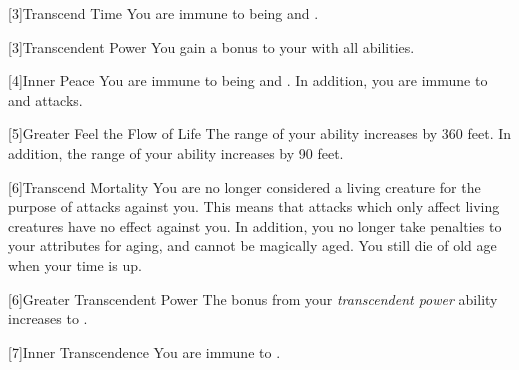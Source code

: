         [3]{Transcend Time} You are immune to being \slowed and \decelerated.

        [3]{Transcendent Power}
        You gain a  bonus to your  with all abilities.

        [4]{Inner Peace} You are immune to being \dazed and \stunned.
        In addition, you are immune to  and  attacks.

        [5]{Greater Feel the Flow of Life}
        The range of your  ability increases by 360 feet.
        In addition, the range of your  ability increases by 90 feet.

        [6]{Transcend Mortality}
        You are no longer considered a living creature for the purpose of attacks against you.
        This means that attacks which only affect living creatures have no effect against you.
        In addition, you no longer take penalties to your attributes for aging, and cannot be magically aged.
        You still die of old age when your time is up.

        [6]{Greater Transcendent Power} The bonus from your \textit{transcendent power} ability increases to .

        [7]{Inner Transcendence} You are immune to .



\newpage
